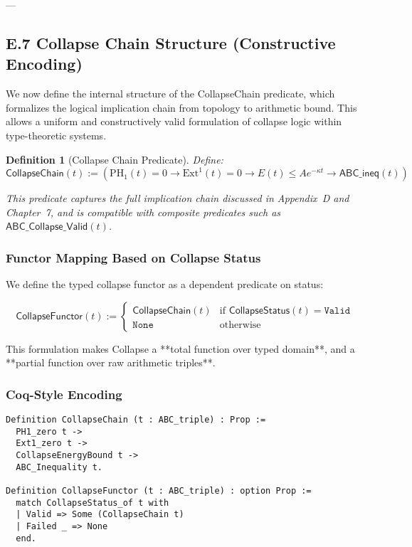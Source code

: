 \documentclass[11pt]{article}
\newtheorem{definition}[theorem]{Definition}
\begin{document}
---

\subsection*{E.7 Collapse Chain Structure (Constructive Encoding)}

We now define the internal structure of the CollapseChain predicate, which formalizes the logical implication chain from topology to arithmetic bound. This allows a uniform and constructively valid formulation of collapse logic within type-theoretic systems.

\begin{definition}[Collapse Chain Predicate]
Define:
\[
\mathsf{CollapseChain}(t) :=
\left(
  \mathrm{PH}_1(t) = 0 \to
  \mathrm{Ext}^1(t) = 0 \to
  E(t) \leq A e^{-\kappa t} \to
  \mathsf{ABC\_ineq}(t)
\right)
\]

This predicate captures the full implication chain discussed in Appendix~D and Chapter~7, and is compatible with composite predicates such as \( \mathsf{ABC\_Collapse\_Valid}(t) \).
\end{definition}

\subsubsection*{Functor Mapping Based on Collapse Status}

We define the typed collapse functor as a dependent predicate on status:

\[
\mathsf{CollapseFunctor}(t) :=
\begin{cases}
\mathsf{CollapseChain}(t) & \text{if } \mathsf{CollapseStatus}(t) = \texttt{Valid} \\
\texttt{None} & \text{otherwise}
\end{cases}
\]

This formulation makes Collapse a **total function over typed domain**, and a **partial function over raw arithmetic triples**.

\subsubsection*{Coq-Style Encoding}

\begin{lstlisting}
Definition CollapseChain (t : ABC_triple) : Prop :=
  PH1_zero t ->
  Ext1_zero t ->
  CollapseEnergyBound t ->
  ABC_Inequality t.

Definition CollapseFunctor (t : ABC_triple) : option Prop :=
  match CollapseStatus_of t with
  | Valid => Some (CollapseChain t)
  | Failed _ => None
  end.
\end{lstlisting}
\end{document}
